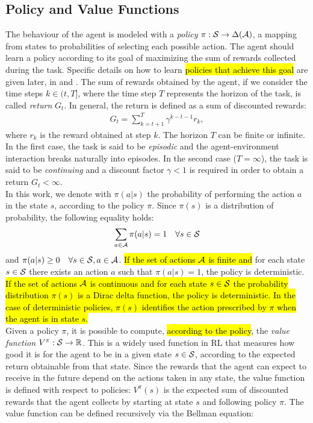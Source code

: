 \subsection{Policy and Value Functions}
The behaviour of the agent is modeled with a \emph{policy} $\pi: \mathcal{S} \to \Delta(\mathcal{A})$, \ie a mapping from states to probabilities of selecting each possible action. The agent should learn a policy according to its goal of maximizing the sum of rewards collected during the task. Specific details on how to learn \hl{policies that achieve this goal} are given later, in  and . The sum of rewards obtained by the agent, if we consider the time steps $k \in (t, T]$, where the time step $T$ represents the horizon of the task, is called \emph{return} $G_t$. In general, the return is defined as a sum of discounted rewards:
\begin{align}G_t = \sum_{k=t+1}^{T} \gamma^{k-t-1} r_k, \end{align} where $r_k$ is the reward obtained at step $k$. The horizon $T$ can be finite or infinite. In the first case, the task is said to be \emph{episodic} and the agent-environment interaction breaks naturally into episodes. In the second case (\ie $T = \infty$), the task is said to be \emph{continuing} and a discount factor $\gamma<1$ is required in order to obtain a return $G_t < \infty$.\\
\newline
In this work, we denote with $\pi(a|s)$ the probability of performing the action $a$ in the state $s$, according to the policy $\pi$. Since $\pi(s)$ is a distribution of probability, the following equality holds:
\begin{align} \sum_{a \in \mathcal{A}} \pi(a|s) = 1 \quad \forall s \in \mathcal{S} \end{align}
and $\pi(a|s) \geq 0 \quad \forall s \in \mathcal{S}, a \in \mathcal{A}$.
\hl{If the set of actions $\mathcal{A}$ is finite and} for each state $s \in \mathcal{S}$ there exists an action $a$ such that $\pi(a|s) = 1$, the policy is deterministic. \hl{If the set of actions $\mathcal{A}$ is continuous and for each state $s \in \mathcal{S}$ the probability distribution $\pi(s)$ is a Dirac delta function, the policy is deterministic. In the case of deterministic policies, $\pi(s)$ identifies the action prescribed by $\pi$ when the agent is in state $s$.}\\
\newline
Given a policy $\pi$, it is possible to compute, \hl{according to the policy}, the \emph{value function} $V^{\pi}: \mathcal{S} \rightarrow \mathbb{R}$. This is a widely used function in \ac{RL} that measures how good it is for the agent to be in a given state $s \in \mathcal{S}$, according to the expected return obtainable from that state. Since the rewards that the agent can expect to receive in the future depend on the actions taken in any state, the value function is defined with respect to policies: $V^{\pi}(s)$ is the expected sum of discounted rewards that the agent collects by starting at state $s$ and following policy $\pi$. The value function can be defined recursively via the Bellman equation: 
